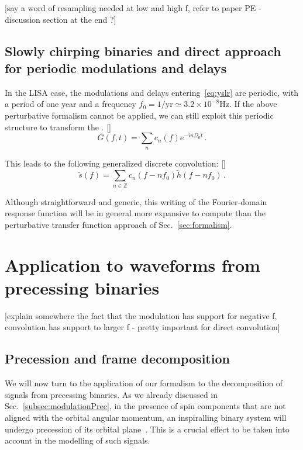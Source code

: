 \documentclass[aps,showpacs,twocolumn,
prd,superscriptaddress,nofootinbib]{revtex4-1}
\newcommand{\be}{\begin{equation}}
\newcommand{\ee}{\end{equation}}
\newcommand{\SM}[1]{{\color{Red} #1}}
\begin{document}
\SM{[say a word of resampling needed at low and high f, refer to paper PE - discussion section at the end ?]}


\subsection{Slowly chirping binaries and direct approach for periodic modulations and delays}\label{subsec:comblisa}



In the LISA case, the modulations and delays entering~\eqref{eq:yslr} are periodic, with a period of one year and a frequency $f_{0} = 1/\mathrm{yr} \simeq 3.2\times 10^{-8}\mathrm{Hz}$. If the above perturbative formalism cannot be applied, we can still exploit this periodic structure to transform the . \SM{[]}
\be
	G(f,t) = \sum_{n} c_{n}(f) e^{-in\Omega_{0}t} \,.
\ee

This leads to the following generalized discrete convolution: \SM{[]}
\be
	\tilde{s}(f) = \sum_{n \in \mathbb{Z}} c_{n}(f - n f_{0}) \tilde{h} (f - n f_{0}) \,.
\ee

Although straightforward and generic, this writing of the Fourier-domain response function will be in general more expansive to compute than the perturbative transfer function approach of Sec.~\ref{sec:formalism}.


\section{Application to waveforms from precessing binaries}
\label{sec:precession}

\SM{[explain somewhere the fact that the modulation has support for negative f, convolution has support to larger f - pretty important for direct convolution]}


\subsection{Precession and frame decomposition}
\label{subsec:precdef}

We will now turn to the application of our formalism to the decomposition of signals from precessing binaries. As we already discussed in Sec.~\ref{subsec:modulationPrec}, in the presence of spin components that are not aligned with the orbital angular momentum, an inspiralling binary system will undergo precession of its orbital plane~\cite{Apostolatos+94, Kidder95}. This is a crucial effect to be taken into account in the modelling of such signals.
\end{document}
